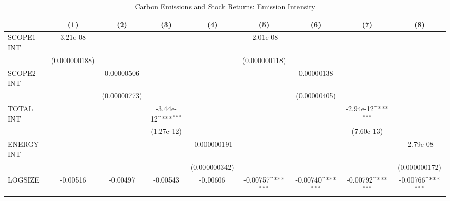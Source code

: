 \begin{table}[htbp]\centering
\def\sym#1{\ifmmode^{#1}\else\(^{#1}\)\fi}
\caption{Carbon Emissions and Stock Returns: Emission Intensity}
\begin{tabular}{l*{8}{c}}
\hline\hline
                    &\multicolumn{1}{c}{(1)}         &\multicolumn{1}{c}{(2)}         &\multicolumn{1}{c}{(3)}         &\multicolumn{1}{c}{(4)}         &\multicolumn{1}{c}{(5)}         &\multicolumn{1}{c}{(6)}         &\multicolumn{1}{c}{(7)}         &\multicolumn{1}{c}{(8)}         \\
\hline
SCOPE1 INT          &    3.21e-08         &                     &                     &                     &   -2.01e-08         &                     &                     &                     \\
                    &(0.000000188)         &                     &                     &                     &(0.000000118)         &                     &                     &                     \\
SCOPE2 INT          &                     &  0.00000506         &                     &                     &                     &  0.00000138         &                     &                     \\
                    &                     &(0.00000773)         &                     &                     &                     &(0.00000405)         &                     &                     \\
TOTAL INT           &                     &                     &   -3.44e-12\sym{***}&                     &                     &                     &   -2.94e-12\sym{***}&                     \\
                    &                     &                     &  (1.27e-12)         &                     &                     &                     &  (7.60e-13)         &                     \\
ENERGY INT          &                     &                     &                     &-0.000000191         &                     &                     &                     &   -2.79e-08         \\
                    &                     &                     &                     &(0.000000342)         &                     &                     &                     &(0.000000172)         \\
LOGSIZE             &    -0.00516         &    -0.00497         &    -0.00543         &    -0.00606         &    -0.00757\sym{***}&    -0.00740\sym{***}&    -0.00792\sym{***}&    -0.00766\sym{***}\\

\end{tabular}
\end{table}
